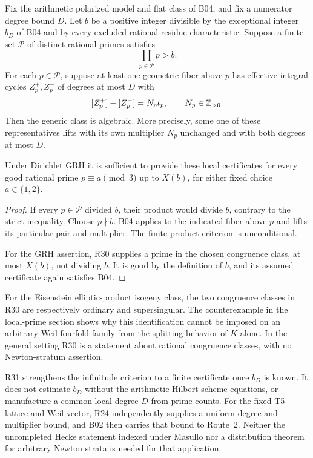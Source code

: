 \begin{theorem}[R31]
\label{thm:R31}
Fix the arithmetic polarized model and flat class of B04, and fix a
numerator degree bound $D$. Let $b$ be a positive integer divisible by
the exceptional integer $b_D$ of B04 and by every excluded rational
residue characteristic. Suppose a finite set $\mathcal P$ of distinct
rational primes satisfies
\[
 \prod_{p\in\mathcal P}p>b.
\]
For each $p\in\mathcal P$, suppose at least one geometric fiber above
$p$ has effective integral cycles $Z_p^+,Z_p^-$ of degrees at most $D$
with
\[
 [Z_p^+]-[Z_p^-]=N_p t_p,\qquad N_p\in\mathbb Z_{>0}.
\]
Then the generic class is algebraic. More precisely, some one of these
representatives lifts with its own multiplier $N_p$ unchanged and with
both degrees at most $D$.

Under Dirichlet GRH it is sufficient to provide these local certificates
for every good rational prime $p\equiv a\pmod3$ up to $X(b)$, for either
fixed choice $a\in\{1,2\}$.
\end{theorem}

\begin{proof}
If every $p\in\mathcal P$ divided $b$, their product would divide $b$,
contrary to the strict inequality. Choose $p\nmid b$. B04 applies to
the indicated fiber above $p$ and lifts its particular pair and
multiplier. The finite-product criterion is unconditional.

For the GRH assertion, R30 supplies a prime in the chosen congruence
class, at most $X(b)$, not dividing $b$. It is good by the definition
of $b$, and its assumed certificate again satisfies B04.
\end{proof}

For the Eisenstein elliptic-product isogeny class, the two congruence
classes in R30 are respectively ordinary and supersingular. The
counterexample in the local-prime section shows why this identification
cannot be imposed on an arbitrary Weil fourfold family from the splitting
behavior of $K$ alone. In the general setting R30 is a statement about
rational congruence classes, with no Newton-stratum assertion.

R31 strengthens the infinitude criterion to a finite certificate once
$b_D$ is known. It does not estimate $b_D$ without the arithmetic
Hilbert-scheme equations, or manufacture a common local degree $D$ from
prime counts. For the fixed T5 lattice and Weil vector, R24 independently
supplies a uniform degree and multiplier bound, and B02 then carries
that bound to Route~2. Neither the uncompleted Hecke statement indexed
under Masullo nor a distribution theorem for arbitrary Newton strata is
needed for that application.

